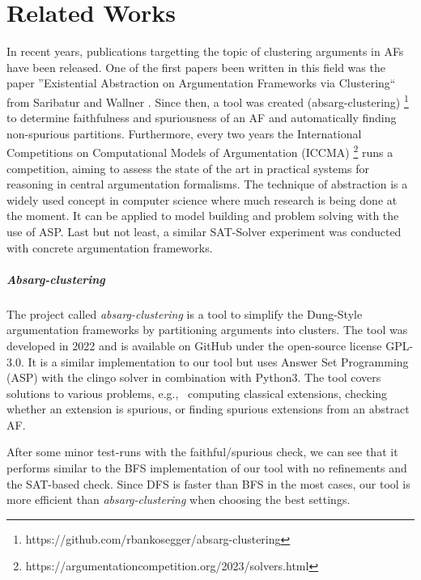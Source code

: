 \chapter{Related Works}
In recent years, publications targetting the topic of clustering arguments in AFs have been released. One of the first papers been written in this field was the paper ''Existential Abstraction on Argumentation Frameworks via Clustering`` from Saribatur and Wallner \cite{DBLP:conf/kr/SaribaturW21}. Since then, a tool was created (absarg-clustering) \footnote{https://github.com/rbankosegger/absarg-clustering} to determine faithfulness and spuriousness of an AF and automatically finding non-spurious partitions. Furthermore, every two years the International Competitions on Computational Models of Argumentation (ICCMA) \footnote{https://argumentationcompetition.org/2023/solvers.html} runs a competition, aiming to assess the state of the art in practical systems for reasoning in central argumentation formalisms. The technique of abstraction is a widely used concept in computer science where much research is being done at the moment. It can be applied to model building and problem solving with the use of ASP. Last but not least, a similar SAT-Solver experiment was conducted with concrete argumentation frameworks.

\paragraph{Absarg-clustering} The project called \emph{absarg-clustering} is a tool to simplify the Dung-Style argumentation frameworks by partitioning arguments into clusters. The tool was developed in 2022 and is available on GitHub under the open-source license GPL-3.0. It is a similar implementation to our tool but uses Answer Set Programming (ASP) with the clingo solver \cite{gebser_et_al:OASIcs.ICLP.2016.2} in combination with Python3. The tool covers solutions to various problems, e.g., \ computing classical extensions, checking whether an extension is spurious, or finding spurious extensions from an abstract AF.

After some minor test-runs with the faithful/spurious check, we can see that it performs similar to the BFS implementation of our tool with no refinements and the SAT-based check. Since DFS is faster than BFS in the most cases, our tool is more efficient than \emph{absarg-clustering} when choosing the best settings.


